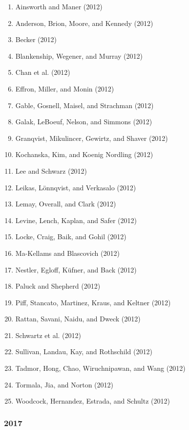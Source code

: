 \documentclass[english,man]{apa6}
\providecommand{\tightlist}{%
  \setlength{\itemsep}{0pt}\setlength{\parskip}{0pt}}
\begin{document}
\begin{enumerate}
\def\labelenumi{\arabic{enumi})}
\tightlist
\item
  Ainsworth and Maner (2012)
\item
  Anderson, Brion, Moore, and Kennedy (2012)
\item
  Becker (2012)
\item
  Blankenship, Wegener, and Murray (2012)
\item
  Chan et al. (2012)
\item
  Effron, Miller, and Monin (2012)
\item
  Gable, Gosnell, Maisel, and Strachman (2012)
\item
  Galak, LeBoeuf, Nelson, and Simmons (2012)
\item
  Granqvist, Mikulincer, Gewirtz, and Shaver (2012)
\item
  Kochanska, Kim, and Koenig Nordling (2012)
\item
  Lee and Schwarz (2012)
\item
  Leikas, Lönnqvist, and Verkasalo (2012)
\item
  Lemay, Overall, and Clark (2012)
\item
  Levine, Lench, Kaplan, and Safer (2012)
\item
  Locke, Craig, Baik, and Gohil (2012)
\item
  Ma-Kellams and Blascovich (2012)
\item
  Nestler, Egloff, Küfner, and Back (2012)
\item
  Paluck and Shepherd (2012)
\item
  Piff, Stancato, Martinez, Kraus, and Keltner (2012)
\item
  Rattan, Savani, Naidu, and Dweck (2012)
\item
  Schwartz et al. (2012)
\item
  Sullivan, Landau, Kay, and Rothschild (2012)
\item
  Tadmor, Hong, Chao, Wiruchnipawan, and Wang (2012)
\item
  Tormala, Jia, and Norton (2012)
\item
  Woodcock, Hernandez, Estrada, and Schultz (2012)
\end{enumerate}

\subsubsection{2017}\label{section-49}
\end{document}
